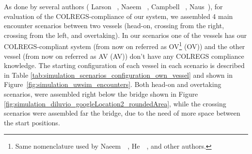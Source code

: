     As done by several authors (\eg{} Larson \etal{}~\cite{Larson2006Autonomous}, Naeem \etal{}~\cite{Naeem2012COLREGS}, Campbell \etal{}~\cite{Campbell2013Automatic}, Naus~\cite{Naus2013Idea}), for evaluation of the \ac{COLREGS}-compliance of our system, we assembled 4 main encounter scenarios between two vessels (head-on, crossing from the right, crossing from the left, and overtaking). In our scenarios one of the vessels has our \ac{COLREGS}-compliant system (from now on referred as \acl{OV}\footnote{Same nomenclature used by Naeem~\etal{}~\cite{Naeem2011Evasive}, He~\etal{}~\cite{He2017}, and other authors.} (\ac{OV})) and the other vessel (from now on referred as \acl{AV} (\ac{AV})) don't have any \ac{COLREGS} compliance knowledge. The starting configuration of each vessel in each scenario is described in Table \ref{tab:simulation_scenarios_configuration_own_vessel} and shown in Figure~\ref{fig:simulation_uwsim_encounters}. Both head-on and overtaking scenarios, were assembled right below the bridge shown in Figure \ref{fig:simulation_diluvio_googleLocation2_roundedArea}, while the crossing scenarios were assembled far the bridge, due to the need of more space between the start positions.
    


